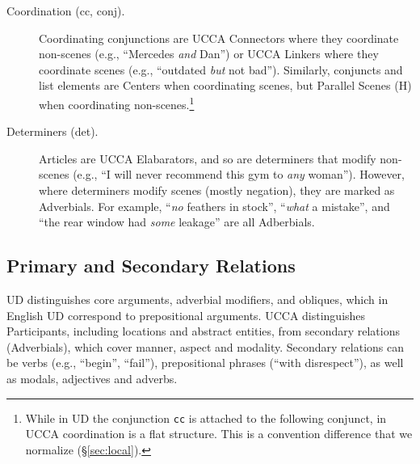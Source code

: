 \documentclass[11pt,a4paper]{article}
\begin{document}
\begin{description}
    

    \item[Coordination (cc, conj).]
      Coordinating conjunctions are UCCA Connectors where they coordinate non-scenes
      (e.g., ``Mercedes \textit{and} Dan'')
      or UCCA Linkers where they coordinate scenes (e.g., ``outdated \textit{but} not bad'').
      Similarly, conjuncts and list elements are Centers when coordinating scenes,
      but Parallel Scenes (H) when coordinating non-scenes.\footnote{While in UD 
      the conjunction \texttt{cc} is attached to the following conjunct,
      in UCCA coordination is a flat structure.
      This is a convention difference that we normalize (\S\ref{sec:local}).}

    \item [Determiners (det).]
      Articles are UCCA Elabarators, and so are determiners that modify non-scenes 
      (e.g., ``I will never recommend this gym to \textit{any} woman'').
      However, where determiners modify scenes (mostly negation),
      they are marked as Adverbials. For example, ``\textit{no} feathers in stock'', ``\textit{what} a mistake'',
      and ``the rear window had \textit{some} leakage'' are all Adberbials.

\end{description}



\subsection{Primary and Secondary Relations}\label{sec:arguments}

UD distinguishes core arguments, adverbial modifiers,
and obliques, which in English UD correspond to prepositional arguments.
UCCA distinguishes Participants, including locations and abstract entities,
from secondary relations (Adverbials), 
which cover manner, aspect and modality.
Secondary relations can be verbs (e.g., ``begin'', ``fail''),
prepositional phrases (``with disrespect''),
as well as modals, adjectives and adverbs.
\end{document}
